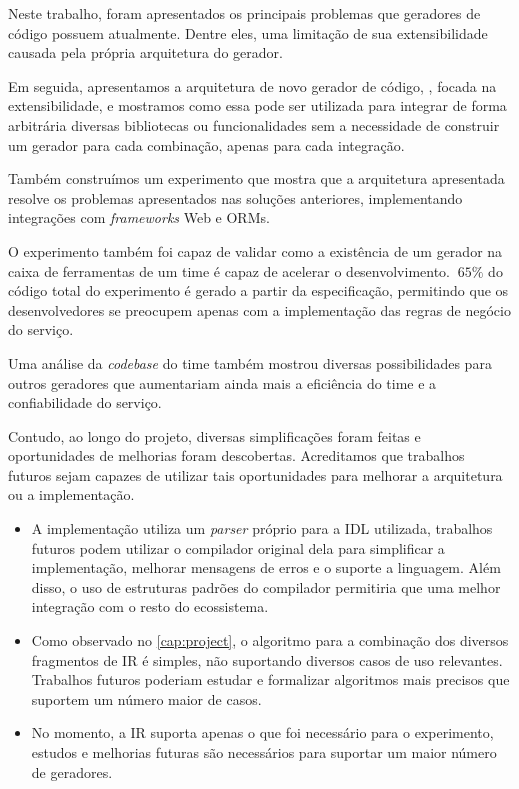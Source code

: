 Neste trabalho, foram apresentados os principais problemas que geradores de código
possuem atualmente. Dentre eles, uma limitação de sua extensibilidade causada
pela própria arquitetura do gerador.

Em seguida, apresentamos a arquitetura de novo gerador de código, \Baker{}, focada
na extensibilidade, e mostramos como essa pode ser utilizada para integrar de forma
arbitrária diversas bibliotecas ou funcionalidades sem a necessidade de construir um
gerador para cada combinação, apenas para cada integração.

Também construímos um experimento que mostra que a arquitetura apresentada
resolve os problemas apresentados nas soluções anteriores, implementando
integrações com \textit{frameworks} Web e ORMs.

O experimento também foi capaz de validar como a existência de um gerador na
caixa de ferramentas de um time é capaz de acelerar o desenvolvimento. $~65\%$
do código total do experimento é gerado a partir da especificação, permitindo
que os desenvolvedores se preocupem apenas com a implementação das regras de
negócio do serviço.

Uma análise da \textit{codebase} do time também mostrou diversas possibilidades
para outros geradores que aumentariam ainda mais a eficiência do time e a
confiabilidade do serviço.

Contudo, ao longo do projeto, diversas simplificações foram feitas e oportunidades
de melhorias foram descobertas. Acreditamos que trabalhos futuros sejam capazes
de utilizar tais oportunidades para melhorar a arquitetura ou a implementação.

\begin{itemize}
\item A implementação utiliza um \textit{parser} próprio para a IDL utilizada,
  trabalhos futuros podem utilizar o compilador original dela para simplificar a
  implementação, melhorar mensagens de erros e o suporte a linguagem. Além disso,
  o uso de estruturas padrões do compilador permitiria que uma melhor integração
  com o resto do ecossistema.
\item Como observado no \cref{cap:project}, o algoritmo para a combinação dos
  diversos fragmentos de IR é simples, não suportando diversos casos de uso
  relevantes. Trabalhos futuros poderiam estudar e formalizar algoritmos mais precisos
  que suportem um número maior de casos.
\item No momento, a IR suporta apenas o que foi necessário para o experimento,
  estudos e melhorias futuras são necessários para suportar um maior número de
  geradores.
\end{itemize}
